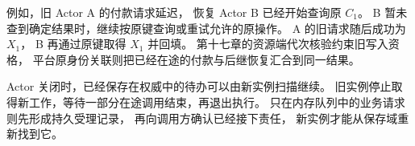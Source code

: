 例如，旧 Actor A 的付款请求延迟，
恢复 Actor B 已经开始查询原 $C_1$。
B 暂未查到确定结果时，继续按原键查询或重试允许的原操作。
A 的旧请求随后成功为 $X_1$，
B 再通过原键取得 $X_1$ 并回填。
第十七章的资源端代次核验约束旧写入资格，
平台原身份关联则把已经在途的付款与后继恢复汇合到同一结果。


Actor 关闭时，已经保存在权威中的待办可以由新实例扫描继续。
旧实例停止取得新工作，等待一部分在途调用结束，再退出执行。
只在内存队列中的业务请求则先形成持久受理记录，
再向调用方确认已经接下责任，
新实例才能从保存域重新找到它。
